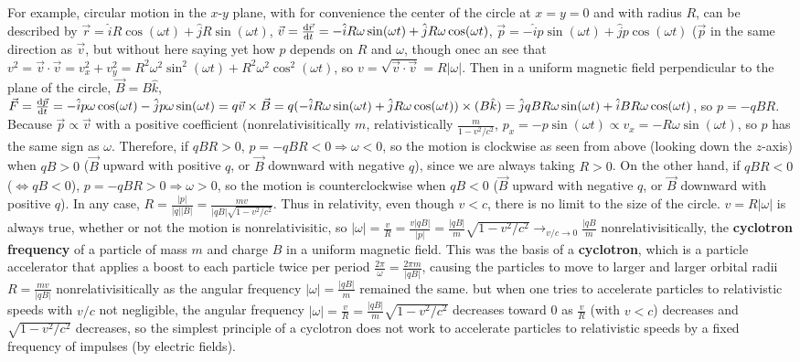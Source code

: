 For example, circular motion in the $x$-$y$ plane, with for convenience the center of the circle at $x=y=0$ and with radius $R$, can be described by $\vec{r} = \hat{i}R\cos(\omega t) + \hat{j} R\sin(\omega t)$, $\vec{v} = \frac{\operatorname{d\!} \vec{r}}{\operatorname{d\!} t} = -\hat{i}R\omega\sin(\omega t) + \hat{j} R\omega \cos(\omega t)$, $\vec{p} = -\hat{i} p \sin(\omega t) + \hat{j} p \cos(\omega t)$ ($\vec{p}$ in the same direction as $\vec{v}$, but without here saying yet how $p$ depends on $R$ and $\omega$, though onec an see that $v^2 = \vec{v}\cdot\vec{v} = v_x^2+v_y^2 = R^2\omega^2\sin^2(\omega t) + R^2\omega^2\cos^2(\omega t)$, so $v = \sqrt{\vec{v}\cdot\vec{v}} = R|\omega|$. Then in a uniform magnetic field perpendicular to the plane of the circle, $\vec{B} = B\hat{k}$, $\vec{F} = \frac{\operatorname{d\!} \vec{p}}{\operatorname{d\!} t} = -\hat{i} p\omega \cos(\omega t) - \hat{j}p\omega \sin(\omega t) = q\vec{v}\times\vec{B} = q(-\hat{i}R\omega\sin(\omega t) + \hat{j}R\omega\cos(\omega t))\times(B\hat{k}) = \hat{j}qBR\omega\sin(\omega t) + \hat{i}BR\omega\cos(\omega t)$, so $p = -qBR$. Because $\vec{p} \propto \vec{v}$ with a positive coefficient (nonrelativisitically $m$, relativistically $\frac{m}{1-v^2/c^2}$, $p_x = -p\sin(\omega t) \propto v_x = -R\omega\sin(\omega t)$, so $p$ has the same sign as $\omega$. Therefore, if $qBR > 0$, $p = -qBR < 0 \Longrightarrow \omega < 0$, so the motion is clockwise as seen from above (looking down the $z$-axis) when $qB > 0$ ($\vec{B}$ upward with positive $q$, or $\vec{B}$ downward with negative $q$), since we are always taking $R>0$. On the other hand, if $qBR < 0$ ($\iff qB < 0$), $p = -qBR > 0 \Longrightarrow \omega > 0$, so the motion is counterclockwise when $qB < 0$ ($\vec{B}$ upward with negative $q$, or $\vec{B}$ downward with positive $q$). In any case, $R = \frac{|p|}{|q||B|} = \frac{mv}{|qB|\sqrt{1-v^2/c^2}}$. Thus in relativity, even though $v<c$, there is no limit to the size of the circle. $v = R|\omega|$ is always true, whether or not the motion is nonrelativisitic, so $|\omega| = \frac{v}{R} = \frac{v|qB|}{|p|} = \frac{|qB|}{m}\sqrt{1-v^2/c^2} \longrightarrow_{v/c \rightarrow 0} \frac{|qB}{m}$ nonrelativisitically, the \textbf{cyclotron frequency} of a particle of mass $m$ and charge $B$ in a uniform magnetic field. This was the basis of a \textbf{cyclotron}, which is a particle accelerator that applies a boost to each particle twice per period $\frac{2\pi}{\omega} = \frac{2\pi m}{|qB|}$, causing the particles to move to larger and larger orbital radii $R = \frac{mv}{|qB|}$ nonrelativisitically as the angular frequency $|\omega| = \frac{|qB|}{m}$ remained the same. but when one tries to accelerate particles to relativistic speeds with $v/c$ not negligible, the angular frequency $|\omega| = \frac{v}{R} = \frac{|qB|}{m}\sqrt{ 1 - v^2/c^2 }$ decreases toward 0 as $\frac{v}{R}$ (with $v < c$) decreases and $\sqrt{1 - v^2/c^2}$ decreases, so the simplest principle of a cyclotron does not work to accelerate particles to relativistic speeds by a fixed frequency of impulses (by electric fields).

